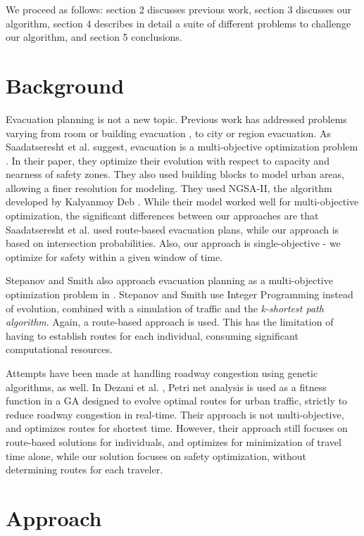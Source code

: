 \documentclass{sig-alternate-05-2015}
\begin{document}
We proceed as follows: section 2 discusses previous work, section 3
discusses our algorithm, section 4 describes in detail a suite of
different problems to challenge our algorithm, and section 5
conclusions.

\section{Background}

Evacuation planning is not a new topic. Previous work has
addressed problems varying from room or building evacuation
\cite{thompson1995computer}, to city or region evacuation.
As Saadatseresht et al. suggest, evacuation is a multi-objective
optimization problem \cite{saadatseresht2009evacuation}. In their
paper, they optimize their evolution with respect to capacity and
nearness of safety zones. They also used building blocks to model
urban areas, allowing a finer resolution for modeling.  They used
NGSA-II, the algorithm developed by Kalyanmoy Deb \cite{deb2002fast}.
While their model worked well for multi-objective optimization, the
significant differences between our approaches are that Saadatseresht
et al. used route-based evacuation plans, while our approach is based
on intersection probabilities. Also, our approach is single-objective
- we optimize for safety within a given window of time.

Stepanov and Smith also approach evacuation planning as a
multi-objective optimization problem in
\cite{stepanov2009multi}. Stepanov and Smith use Integer Programming
instead of evolution, combined with a simulation of traffic and the
\textit{k-shortest path algorithm}. Again, a route-based approach is
used. This has the limitation of having to establish routes for each
individual, consuming significant computational resources.

Attempts have been made at handling roadway congestion using genetic
algorithms, as well. In Dezani et al. \cite{dezani2014optimizing},
Petri net analysis is used as a fitness function in a GA designed to
evolve optimal routes for urban traffic, strictly to reduce roadway
congestion in real-time. Their approach is not multi-objective, and
optimizes routes for shortest time.  However, their approach still
focuses on route-based solutions for individuals, and optimizes for
minimization of travel time alone, while our solution focuses on
safety optimization, without determining routes for each traveler.

\section{Approach}
\end{document}

